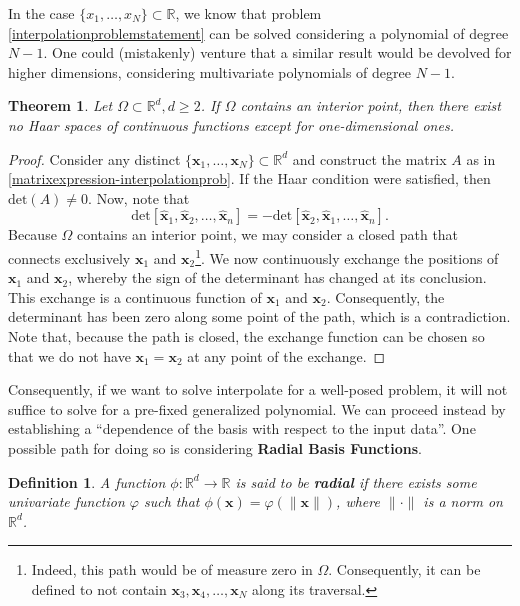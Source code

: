 \documentclass[12pt]{report} %
\newtheorem{definition}{Definition}
\newtheorem{theorem}{Theorem}
\newcommand{\tmmathbf}[1]{\ensuremath{\boldsymbol{#1}}}
\newcommand{\tmstrong}[1]{\textbf{#1}}
\begin{document}
In the case $\{ x_1, \ldots, x_N \} \subset \mathbb{R}$, we know that problem
\ref{interpolationproblemstatement} can be solved considering a polynomial of
degree $N - 1$. One could (mistakenly) venture that a similar result would be devolved for
higher dimensions, considering multivariate polynomials of degree $N-1$.

\begin{theorem}\label{thm-haar-spaces-polynomials}
  Let $\Omega \subset \mathbb{R}^d, d \geq 2$. If $\Omega$ contains an
  interior point, then there exist no Haar spaces of continuous functions except for one-dimensional ones.
\end{theorem}

\begin{proof}
  Consider any distinct $\{ \tmmathbf{x}_1, \ldots, \tmmathbf{x}_N \} \subset
    \mathbb{R}^d$ and construct the matrix $A$ as in
  \eqref{matrixexpression-interpolationprob}. If the Haar condition were
  satisfied, then $\text{det} (A) \neq 0$. Now, note that $$\text{det}
    [\hat{\tmmathbf{x}}_1, \hat{\tmmathbf{x}}_2, \ldots, \hat{\tmmathbf{x}}_n] =
    - \text{det} [\hat{\tmmathbf{x}}_2, \hat{\tmmathbf{x}}_1, \ldots,
      \hat{\tmmathbf{x}}_n].$$ Because $\Omega$ contains an interior point, we may
  consider a closed path that connects exclusively $\tmmathbf{x}_1$ and
  $\tmmathbf{x}_2$\footnote{Indeed, this path would be of measure zero in
    $\Omega$. Consequently, it can be defined to not contain $\tmmathbf{x}_3,
      \tmmathbf{x}_4, \ldots, \tmmathbf{x}_N$ along its traversal.}. We now
  continuously exchange the positions of $\tmmathbf{x}_1$ and
  $\tmmathbf{x}_2$, whereby the sign of the determinant has changed
  at its conclusion. This exchange is a continuous function of $\tmmathbf{x}_1$
  and $\tmmathbf{x}_2$. Consequently, the determinant has been zero along some
  point of the path, which is a contradiction. Note that, because the path is
  closed, the exchange function can be chosen so that we do not have
  $\tmmathbf{x}_1 = \tmmathbf{x}_2$ at any point of the exchange.
\end{proof}

Consequently, if we want to solve interpolate for a well-posed problem, it will not suffice to solve for a pre-fixed generalized polynomial. We can proceed instead by establishing a ``dependence of the basis with respect to the input data''. One possible path for doing so is considering \textbf{Radial Basis Functions}.

\begin{definition}\label{radialfunctions}
  A function $\phi : \mathbb{R}^d \rightarrow \mathbb{R}$ is said to be
    {\tmstrong{radial}} if there exists some univariate function $\varphi$ such
  that $\phi (\tmmathbf{x}) = \varphi (\| \tmmathbf{x} \|)$, where $\| \cdot
    \|$ is a norm on $\mathbb{R}^d$.
\end{definition}
\end{document}
